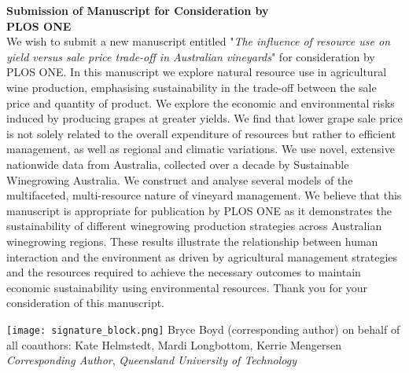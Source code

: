 \documentclass{article}
\begin{document}
\centering \textbf{Submission of Manuscript for Consideration by \\PLOS ONE}\\
\bigskip %
\justifying
\newline \noindent
We wish to submit a new manuscript entitled "\textit{The influence of resource use on yield versus sale price trade-off in Australian vineyards}" for consideration by PLOS ONE.
\newline \noindent
In this manuscript we explore natural resource use in agricultural wine production, emphasising sustainability in the trade-off between the sale price and quantity of product. We explore the economic and environmental risks induced by producing grapes at greater yields. We find that lower grape sale price is not solely related to the overall expenditure of resources but rather to efficient management, as well as regional and climatic variations. We use novel, extensive nationwide data from Australia, collected over a decade by Sustainable Winegrowing Australia. We construct and analyse several models of the multifaceted, multi-resource nature of vineyard management. 
\newline \noindent
We believe that this manuscript is appropriate for publication by PLOS ONE as it demonstrates the sustainability of different winegrowing production strategies across Australian winegrowing regions. These results illustrate the relationship between human interaction and the environment as driven by agricultural management strategies and the resources required to achieve the necessary outcomes to maintain economic sustainability using environmental resources. Thank you for your consideration of this manuscript.
\bigskip \noindent%

\texttt{[image: signature\_block.png]}
\newline \noindent
Bryce Boyd (corresponding author) on behalf of all coauthors: Kate Helmstedt, Mardi Longbottom, Kerrie Mengersen\\
\newline \noindent
\textit{Corresponding Author}, \textit{Queensland University of Technology}
\end{document}
